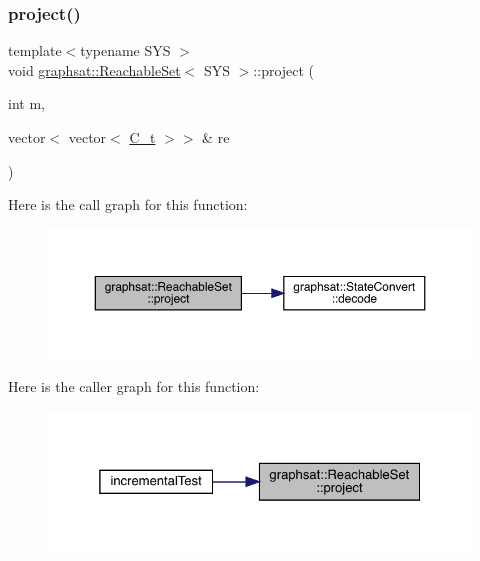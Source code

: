 \subsubsection{\texorpdfstring{project()}{project()}}
{\footnotesize\ttfamily template$<$typename S\+YS $>$ \\
void \mbox{\hyperlink{classgraphsat_1_1_reachable_set}{graphsat\+::\+Reachable\+Set}}$<$ S\+YS $>$\+::project (\begin{DoxyParamCaption}\item[{int}]{m,  }\item[{vector$<$ vector$<$ \mbox{\hyperlink{classgraphsat_1_1_reachable_set_a0b7981a216ec4c46be913e08d5f0cd07}{C\+\_\+t}} $>$$>$ \&}]{re }\end{DoxyParamCaption})\hspace{0.3cm}{\ttfamily [inline]}}

Here is the call graph for this function\+:
\nopagebreak
\begin{figure}[H]
\begin{center}
\leavevmode
\includegraphics[width=350pt]{classgraphsat_1_1_reachable_set_aa69dd707012183b8c262362d6fb41907_cgraph}
\end{center}
\end{figure}
Here is the caller graph for this function\+:
\nopagebreak
\begin{figure}[H]
\begin{center}
\leavevmode
\includegraphics[width=325pt]{classgraphsat_1_1_reachable_set_aa69dd707012183b8c262362d6fb41907_icgraph}
\end{center}
\end{figure}
\mbox{\label{classgraphsat_1_1_reachable_set_a8c10e522762b721f4c24883ff7abb923}} 
